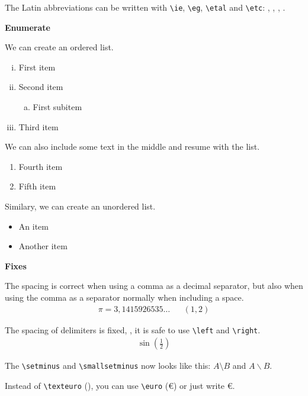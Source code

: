 \documentclass{myassignment}
\begin{document}
The Latin abbreviations can be written with \texttt{\textbackslash ie}, \texttt{\textbackslash eg}, \texttt{\textbackslash etal} and \texttt{\textbackslash etc}: \ie, \eg, \etal, \etc.

\newpage

\textbf{Enumerate}

We can create an ordered list.

\begin{enumerate}[i.]
    \item First item
    \item Second item
    \begin{enumerate}[(a)]
        \item First subitem
    \end{enumerate}
    \item Third item
\end{enumerate}

We can also include some text in the middle and resume with the list.

\begin{enumerate}[resume*]
    \item Fourth item
    \item Fifth item
\end{enumerate}

Similary, we can create an unordered list.

\begin{itemize}
    \item An item
    \item Another item
\end{itemize}

\textbf{Fixes}

The spacing is correct when using a comma as a decimal separator, but also when using the comma as a separator normally when including a space.
\begin{align*}
    \pi = 3,1415926535\dots && (1, 2)
\end{align*}

The spacing of delimiters is fixed, \ie, it is safe to use \texttt{\textbackslash left} and \texttt{\textbackslash right}.
\begin{align*}
    \sin \left(\frac{1}{2}\right)
\end{align*}

The \texttt{\textbackslash setminus} and \texttt{\textbackslash smallsetminus} now looks like this: $A \setminus B$ and $A \smallsetminus B$.

Instead of \texttt{\textbackslash texteuro} (\texteuro), you can use \texttt{\textbackslash euro} (\euro) or just write €.
\end{document}
